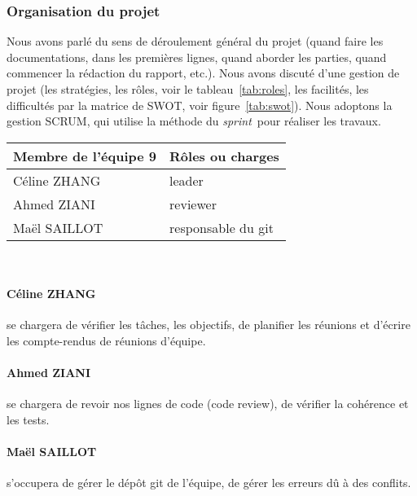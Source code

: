\subsubsection*{Organisation du projet}
Nous avons parlé du sens de déroulement général du projet (quand faire les documentations, dans les premières lignes, quand aborder les parties, quand commencer la rédaction du rapport, etc.). Nous avons discuté d'une gestion de projet (les stratégies, les rôles, voir le tableau~\ref{tab:roles}, les facilités, les difficultés par la matrice de SWOT, voir figure~\ref{tab:swot}). Nous adoptons la gestion SCRUM, qui utilise la méthode du \textsl{sprint}\footnotemark \ pour réaliser les travaux.

    \begin{table}[!h]
    \begin{center}
        \begin{tabular}{|l|l|}
        \hline
            Membre de l'équipe 9 & Rôles ou charges \\
        \hline
        \hline
            Céline ZHANG & leader \\
        \hline
            Ahmed ZIANI & reviewer \\
        \hline
            Maël SAILLOT & responsable du git \\
        \hline
        \end{tabular}\\
    \end{center}
    \end{table}

\paragraph{Céline ZHANG} se chargera de vérifier les tâches, les objectifs, de planifier les réunions et d'écrire les compte-rendus de réunions d'équipe.
\paragraph{Ahmed ZIANI} se chargera de revoir nos lignes de code (code review), de vérifier la cohérence et les tests.
\paragraph{Maël SAILLOT} s'occupera de gérer le dépôt git de l'équipe, de gérer les erreurs dû à des conflits.

